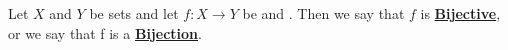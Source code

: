 \newcommand{\Bijective}[0]{\textbf{\hyperref[def:Bijective]{Bijective}}\xspace}
\newcommand{\Bijectivity}[0]{\textbf{\hyperref[def:Bijective]{Bijectivity}}\xspace}
\newcommand{\Bijection}[0]{\textbf{\hyperref[def:Bijective]{Bijection}}\xspace}
\newcommand{\Bijections}[0]{\textbf{\hyperref[def:Bijective]{Bijections}}\xspace}
\begin{df}[Bijective]
\label{def:Bijective}

\rm
    Let $X$ and $Y$ be sets and let 
    $f:X \to Y$ be \Surjective and \Injective. 
    Then we say that $f$ is 
    \Bijective, or we say that f is a 
    \Bijection. 
\end{df}
